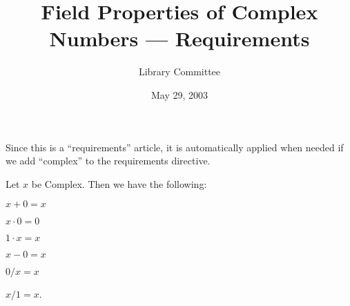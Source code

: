 \documentclass{article}
\title{Field Properties of Complex Numbers --- Requirements}
\author{Library Committee}
\date{May 29, 2003}
\begin{document}
\maketitle
\begin{remark}
Since this is a ``requirements'' article, it is automatically applied
when needed if we add ``complex'' to the requirements directive.
\end{remark}
Let $x$ be Complex. Then we have the following:
\begin{thm}
\item $x+0=x$
\item $x\cdot0=0$
\item $1\cdot x=x$
\item $x-0=x$
\item $0/x=x$
\item $x/1=x$.
\end{thm}
\end{document}
